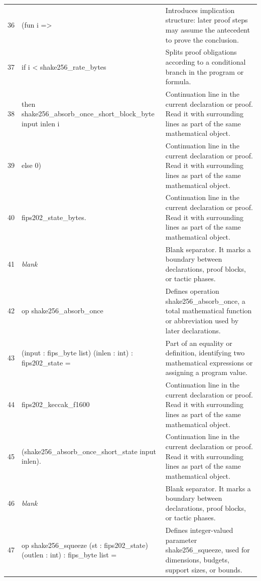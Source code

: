 \documentclass[10pt]{article}
\begin{document}
\begin{longtable}{r L{0.53\textwidth} L{0.37\textwidth}}
36 & {\ttfamily\scriptsize     (fun i =>} & Introduces implication structure: later proof steps may assume the antecedent to prove the conclusion. \\
37 & {\ttfamily\scriptsize        if i < shake256\_rate\_bytes} & Splits proof obligations according to a conditional branch in the program or formula. \\
38 & {\ttfamily\scriptsize        then shake256\_absorb\_once\_short\_block\_byte input inlen i} & Continuation line in the current declaration or proof.  Read it with surrounding lines as part of the same mathematical object. \\
39 & {\ttfamily\scriptsize        else 0)} & Continuation line in the current declaration or proof.  Read it with surrounding lines as part of the same mathematical object. \\
40 & {\ttfamily\scriptsize     fips202\_state\_bytes.} & Continuation line in the current declaration or proof.  Read it with surrounding lines as part of the same mathematical object. \\
41 & {\ttfamily\scriptsize \emph{blank}} & Blank separator.  It marks a boundary between declarations, proof blocks, or tactic phases. \\
42 & {\ttfamily\scriptsize op shake256\_absorb\_once} & Defines operation shake256\_absorb\_once, a total mathematical function or abbreviation used by later declarations. \\
43 & {\ttfamily\scriptsize    (input : fips\_byte list) (inlen : int) : fips202\_state =} & Part of an equality or definition, identifying two mathematical expressions or assigning a program value. \\
44 & {\ttfamily\scriptsize   fips202\_keccak\_f1600} & Continuation line in the current declaration or proof.  Read it with surrounding lines as part of the same mathematical object. \\
45 & {\ttfamily\scriptsize     (shake256\_absorb\_once\_short\_state input inlen).} & Continuation line in the current declaration or proof.  Read it with surrounding lines as part of the same mathematical object. \\
46 & {\ttfamily\scriptsize \emph{blank}} & Blank separator.  It marks a boundary between declarations, proof blocks, or tactic phases. \\
47 & {\ttfamily\scriptsize op shake256\_squeeze (st : fips202\_state) (outlen : int) : fips\_byte list =} & Defines integer-valued parameter shake256\_squeeze, used for dimensions, budgets, support sizes, or bounds. \\

\end{longtable}
\end{document}

